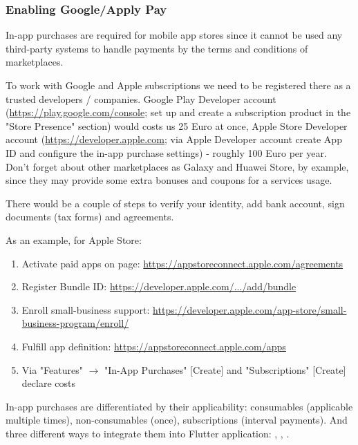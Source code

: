 \subsubsection{Enabling Google/Apply Pay}

In-app purchases are required for mobile app stores since it cannot be used any third-party systems to handle payments
by the terms and conditions of marketplaces.

To work with Google and Apple subscriptions we need to be registered there as a trusted developers / companies. Google 
Play Developer account (\href{https://play.google.com/console}{https://play.google.com/console}; set up and create a 
subscription product in the "Store Presence" section) would costs us 25 Euro at once, Apple Store Developer 
account (\href{https://developer.apple.com}{https://developer.apple.com}; via Apple Developer account create App ID and 
configure the in-app purchase settings) - roughly 100 Euro per year. Don't forget about other marketplaces as 
Galaxy and Huawei Store, by example, since they may provide some extra bonuses and coupons for a services usage.

There would be a couple of steps to verify your identity, add bank account, sign documents (tax forms) and agreements.

As an example, for Apple Store:
\begin{enumerate}
  \item Activate paid apps on page: \href{https://appstoreconnect.apple.com/agreements}{https://appstoreconnect.apple.com/agreements}
  \item Register Bundle ID: 
  \href{https://developer.apple.com/account/resources/identifiers/bundleId/add/bundle}{https://developer.apple.com/.../add/bundle}
  \item Enroll small-business support: 
  \href{https://developer.apple.com/app-store/small-business-program/enroll/}{https://developer.apple.com/app-store/small-business-program/enroll/}
  \item Fulfill app definition: 
  \href{https://appstoreconnect.apple.com/apps}{https://appstoreconnect.apple.com/apps}
  \item Via "Features" $\rightarrow$ "In-App Purchases" [Create] and "Subscriptions" [Create] declare costs
\end{enumerate}

In-app purchases are differentiated by their applicability: consumables (applicable multiple times), non-consumables 
(once), subscriptions (interval payments). And three different ways to integrate them into Flutter application:
, , .
